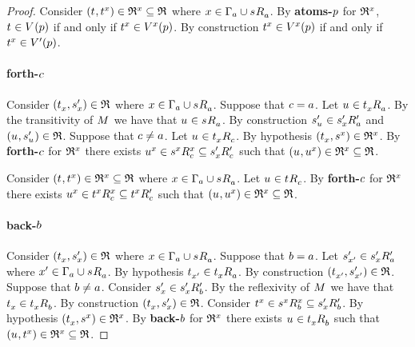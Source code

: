 \begin{proof}
Consider $(\kStateT, \kStateT[x]) \in \refinement^x \subseteq \refinement$ where $x \in \Gamma_\agentA \cup \kSuccessorsA{\kStateS}$.
By {\bf atoms-$\atomP$} for $\refinement^x$, $\kStateT \in \kValuation(\atomP)$ if and only if $\kStateT[x] \in \kValuation[x](\atomP)$.
By construction $\kStateT[x] \in \kValuation[x](\atomP)$ if and only if $\kStateT[x] \in \kValuationP(\atomP)$.

\paragraph{forth-$\agentC$}
Consider $(\kStateT_x, \kStateSP_x) \in \refinement$ where $x \in \Gamma_\agentA \cup \kSuccessorsA{\kStateS}$.
Suppose that $\agentC = \agentA$.
Let $\kStateU \in \kSuccessorsA{\kStateT_x}$.
By the transitivity of $\kModel$ we have that $\kStateU \in \kSuccessorsA{\kStateS}$.
By construction $\kStateSP_{\kStateU} \in \kSuccessorsPA{\kStateSP_x}$ and $(\kStateU, \kStateSP_{\kStateU}) \in \refinement$.
Suppose that $\agentC \neq \agentA$.
Let $\kStateU \in \kSuccessorsC{\kStateT_x}$.
By hypothesis $(\kStateT_x, \kStateS[x]) \in \refinement^x$.
By {\bf forth-$\agentC$} for $\refinement^x$ there exists $\kStateU[x] \in \kSuccessorsC[x]{\kStateS[x]} \subseteq \kSuccessorsPC{\kStateSP_x}$ such that $(\kStateU, \kStateU[x]) \in \refinement^x \subseteq \refinement$.

Consider $(\kStateT, \kStateT[x]) \in \refinement^x \subseteq \refinement$ where $x \in \Gamma_\agentA \cup \kSuccessorsA{\kStateS}$.
Let $\kStateU \in \kSuccessorsC{\kStateT}$.
By {\bf forth-$\agentC$} for $\refinement^x$ there exists $\kStateU[x] \in \kSuccessorsC[x]{\kStateT[x]} \subseteq \kSuccessorsPC{\kStateT[x]}$ such that $(\kStateU, \kStateU[x]) \in \refinement^x \subseteq \refinement$.

\paragraph{back-$\agentB$}
Consider $(\kStateT_x, \kStateSP_x) \in \refinement$ where $x \in \Gamma_\agentA \cup \kSuccessorsA{\kStateS}$.
Suppose that $\agentB = \agentA$.
Let $\kStateSP_{x'} \in \kSuccessorsPA{\kStateSP_x}$ where $x' \in \Gamma_\agentA \cup \kSuccessorsA{\kStateS}$.
By hypothesis $\kStateT_{x'} \in \kSuccessorsA{\kStateT_x}$.
By construction $(\kStateT_{x'}, \kStateSP_{x'}) \in \refinement$.
Suppose that $\agentB \neq \agentA$.
Consider $\kStateSP_x \in \kSuccessorsPB{\kStateSP_x}$.
By the reflexivity of $\kModel$ we have that $\kStateT_x \in \kSuccessorsB{\kStateT_x}$.
By construction $(\kStateT_x, \kStateSP_x) \in \refinement$.
Consider $\kStateT[x] \in \kSuccessorsB[x]{\kStateS[x]} \subseteq \kSuccessorsPB{\kStateSP_x}$.
By hypothesis $(\kStateT_x, \kStateS[x]) \in \refinement^x$.
By {\bf back-$\agentB$} for $\refinement^x$ there exists $\kStateU \in \kSuccessorsB{\kStateT_x}$ such that $(\kStateU, \kStateT[x]) \in \refinement^x \subseteq \refinement$.


\end{proof}
